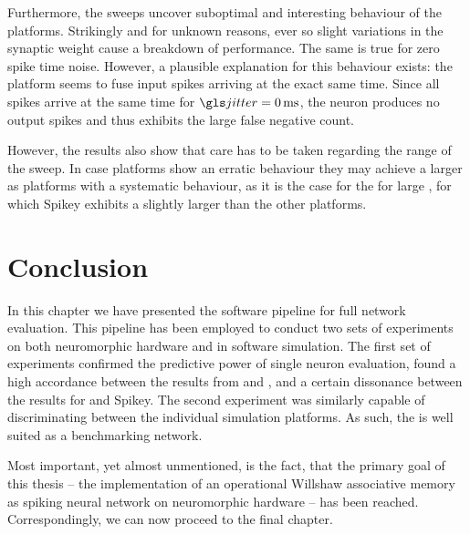 Furthermore, the sweeps uncover suboptimal and interesting behaviour of the platforms. Strikingly and for unknown reasons, ever so slight variations in the synaptic weight cause a breakdown of \ESS performance. The same is true for zero spike time noise. However, a plausible explanation for this behaviour exists: the platform seems to fuse input spikes arriving at the exact same time. Since all spikes arrive at the same time for $\jitter = \SI{0}{\milli\second}$, the neuron produces no output spikes and thus exhibits the large false negative count.

However, the results also show that care has to be taken regarding the range of the sweep. In case platforms show an erratic behaviour they may achieve a larger \info as platforms with a systematic behaviour, as it is the case for the for large \jitter, for which Spikey exhibits a slightly larger \info than the other platforms.


\section{Conclusion}

In this chapter we have presented the software pipeline for full network evaluation. This pipeline has been employed to conduct two sets of experiments on both neuromorphic hardware and in software simulation. The first set of experiments confirmed the predictive power of single neuron evaluation, found a high accordance between the results from \NMMC and \NEST, and a certain dissonance between the results for \NEST and Spikey. The second experiment was similarly capable of discriminating between the individual simulation platforms. As such, the \BiNAM is well suited as a benchmarking network.

Most important, yet almost unmentioned, is the fact, that the primary goal of this thesis -- the implementation of an operational Willshaw associative memory as spiking neural network on neuromorphic hardware -- has been reached. Correspondingly, we can now proceed to the final chapter.
